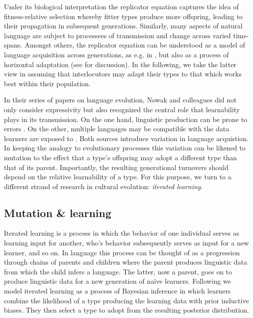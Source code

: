 \documentclass[a4paper]{article}
\begin{document}
Under its biological interpretation the replicator equation captures the idea of fitness-relative selection whereby fitter types produce more offspring, leading to their propagation in subsequent generations. Similarly, many aspects of natural language are subject to processees of transmission and change across varied time-spans. Amongst others, the replicator equation can be understood as a model of language acquisition across generations, as e.g. in \citealt{nowak+etal:2002}, but also as a process of horizontal adaptation (see \citealt[\S3.3]{benz+etal:2005b} for discussion). In the following, we take the latter view in assuming that interlocutors may adapt their types to that which works best within their population. 

In their series of papers on language evolution, Nowak and colleagues did not only consider expressivity but also recognized the central role that learnability plays in its transmission. On the one hand, linguistic production can be prone to errors \citep{nowak+krakauer:1999}. On the other, multiple languages may be compatible with the data learners are exposed to \citep{nowak+etal:2002}. Both sources introduce variation in language acquistion. In keeping the analogy to evolutionary processes this variation can be likened to mutation to the effect that a type's offspring may adopt a different type than that of its parent. Importantly, the resulting generational turnovers should depend on the relative learnability of a type. For this purpose, we turn to a different strand of research in cultural evolution: {\em iterated learning}. 


\subsection{Mutation \& learning}\label{sec:learnability}
Iterated learning is a process in which the behavior of one individual serves as learning input for another, who's behavior subsequently serves as input for a new learner, and so on. In language this process can be thought of as a progression through chains of parents and children where the parent produces linguistic data from which the child infers a language. The latter, now a parent, goes on to produce linguistic data for a new generation of na\"ive learners. Following \citet{griffiths+kalish:2007} we model iterated learning as a process of Bayesian inference in which learners combine the likelihood of a type producing the learning data with prior inductive biases. They then select a type to adopt from the resulting posterior distribution.
\end{document}
